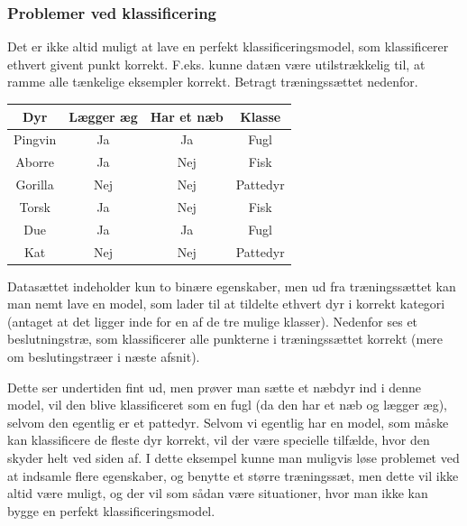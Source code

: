 \documentclass{article}
\begin{document}
\subsubsection{Problemer ved klassificering}
Det er ikke altid muligt at lave en perfekt klassificeringsmodel, som klassificerer ethvert givent punkt korrekt. F.eks. kunne datæn være utilstrækkelig til, at ramme alle tænkelige eksempler korrekt. Betragt træningssættet nedenfor. 

\begin{tabular}{c|c|c|c}
	Dyr & Lægger æg & Har et næb & Klasse\\
	\hline
	Pingvin & Ja & Ja & Fugl\\
	Aborre & Ja & Nej & Fisk\\
	Gorilla & Nej & Nej & Pattedyr\\
	Torsk & Ja & Nej & Fisk\\
	Due & Ja & Ja & Fugl\\
	Kat & Nej & Nej & Pattedyr
\end{tabular}

Datasættet indeholder kun to binære egenskaber, men ud fra træningssættet kan man nemt lave en model, som lader til at tildelte ethvert dyr i korrekt kategori (antaget at det ligger inde for en af de tre mulige klasser). Nedenfor ses et beslutningstræ, som klassificerer alle punkterne i træningssættet korrekt (mere om beslutingstræer i næste afsnit).

\begin{center}
\end{center}
Dette ser undertiden fint ud, men prøver man sætte et næbdyr ind i denne model, vil den blive klassificeret som en fugl (da den har et næb og lægger æg), selvom den egentlig er et pattedyr. Selvom vi egentlig har en model, som måske kan klassificere de fleste dyr korrekt, vil der være specielle tilfælde, hvor den skyder helt ved siden af. I dette eksempel kunne man muligvis løse problemet ved at indsamle flere egenskaber, og benytte et større træningssæt, men dette vil ikke altid være muligt, og der vil som sådan være situationer, hvor man ikke kan bygge en perfekt klassificeringsmodel.
\end{document}
